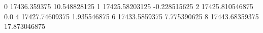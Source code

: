 0 17436.359375 10.548828125
1 17425.58203125 -0.228515625
2 17425.810546875 0.0
4 17427.74609375 1.935546875
6 17433.5859375 7.775390625
8 17443.68359375 17.873046875
